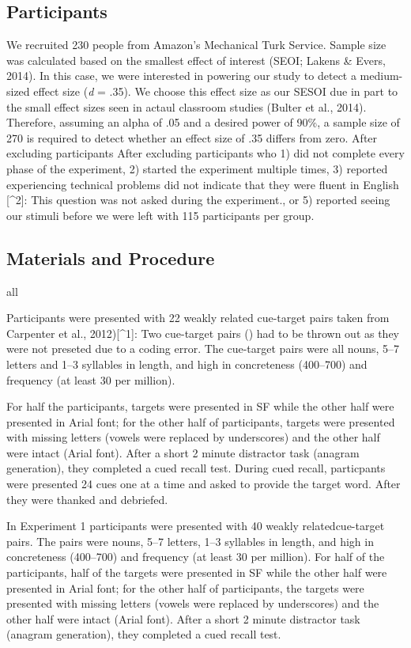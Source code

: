 \documentclass[doc]{apa6}
\begin{document}
\hypertarget{participants}{%
\subsection{Participants}\label{participants}}

We recruited 230 people from Amazon's Mechanical Turk Service. Sample size was calculated based on the smallest effect of interest (SEOI; Lakens \& Evers, 2014). In this case, we were interested in powering our study to detect a medium-sized effect size (\emph{d} = .35). We choose this effect size as our SESOI due in part to the small effect sizes seen in actaul classroom studies (Bulter et al., 2014). Therefore, assuming an alpha of .05 and a desired power of 90\%, a sample size of 270 is required to detect whether an effect size of .35 differs from zero. After excluding participants After excluding participants who 1) did not complete every phase of the experiment, 2) started the experiment multiple times, 3) reported experiencing technical problems did not indicate that they were fluent in English {[}\^{}2{]}: This question was not asked during the experiment., or 5) reported seeing our stimuli before we were left with 115 participants per group.

\hypertarget{materials-and-procedure}{%
\subsection{Materials and Procedure}\label{materials-and-procedure}}

all

Participants were presented with 22 weakly related cue-target pairs taken from Carpenter et al., 2012){[}\^{}1{]}: Two cue-target pairs () had to be thrown out as they were not preseted due to a coding error. The cue-target pairs were all nouns, 5--7 letters and 1--3 syllables in length, and high in concreteness (400--700) and frequency (at least 30 per million).

For half the participants, targets were presented in SF while the other half were presented in Arial font; for the other half of participants, targets were presented with missing letters (vowels were replaced by underscores) and the other half were intact (Arial font). After a short 2 minute distractor task (anagram generation), they completed a cued recall test. During cued recall, particpants were presented 24 cues one at a time and asked to provide the target word. After they were thanked and debriefed.

In Experiment 1 participants were presented with 40 weakly relatedcue-target pairs. The pairs were nouns, 5--7 letters, 1--3 syllables in length, and high in concreteness (400--700) and frequency (at least 30 per million). For half of the participants, half of the targets were presented in SF while the other half were presented in Arial font; for the other half of participants, the targets were presented with missing letters (vowels were replaced by underscores) and the other half were intact (Arial font). After a short 2 minute distractor task (anagram generation), they completed a cued recall test.
\end{document}
